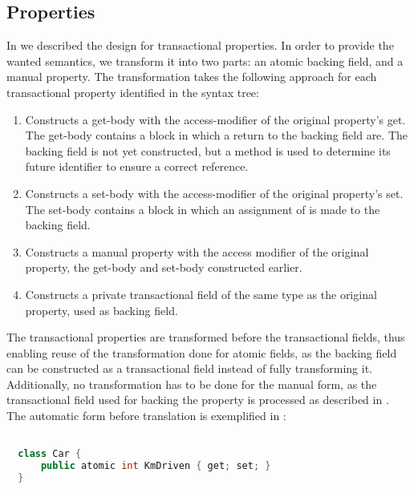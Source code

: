 \subsection{Properties}
In  we described the design for transactional properties. In order to provide the wanted semantics, we transform it into two parts: an atomic backing field, and a manual property. The transformation takes the following approach for each transactional property identified in the syntax tree:

\begin{enumerate}
	\item Constructs a get-body with the access-modifier of the original property's get. The get-body contains a block in which a return to the backing field are. The backing field is not yet constructed, but a method is used to determine its future identifier to ensure a correct reference.
	\item Constructs a set-body with the access-modifier of the original property's set. The set-body contains a block in which an assignment of  is made to the backing field.
	\item Constructs a manual property with the access modifier of the original property, the get-body and set-body constructed earlier.
	\item Constructs a private transactional field of the same type as the original property, used as backing field.
\end{enumerate}

The transactional properties are transformed before the transactional fields, thus enabling reuse of the transformation done for atomic fields, as the backing field can be constructed as a transactional field instead of fully transforming it. Additionally, no transformation has to be done for the manual form, as the transactional field used for backing the property is processed as described in . The automatic form before translation is exemplified in :

\begin{lstlisting}[label=lst:before_atomic_property,
  caption={Before Transformation},
  language=Java,  
  showspaces=false,
  showtabs=false,
  breaklines=true,
  showstringspaces=false,
  breakatwhitespace=true,
  commentstyle=\color{greencomments},
  keywordstyle=\color{bluekeywords},
  stringstyle=\color{redstrings},
  morekeywords={atomic, retry, orElse, var, get, set, string}]  % Start your code-block

  class Car {
      public atomic int KmDriven { get; set; }
  }
\end{lstlisting}

